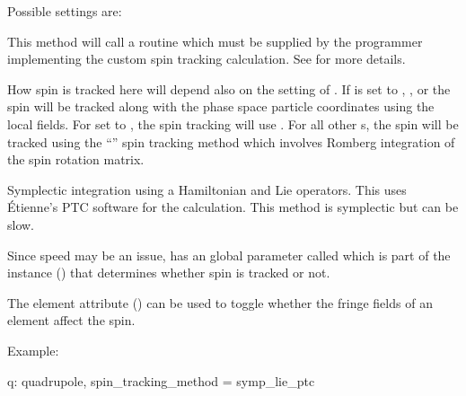 Possible  settings are:
\begin{description}

\item[\vn{Custom}] \Newline
This method will call a routine  which must be supplied by the
programmer implementing the custom spin tracking calculation. See  for
more details.

\item[\vn{Tracking}] \Newline
How spin is tracked here will depend also on the setting of . If
 is set to , , or  the spin will
be tracked along with the phase space particle coordinates using the local fields. For
 set to , the spin tracking will use .  For all other
s, the spin will be tracked using the ``'' spin tracking
method which involves Romberg integration of the spin rotation matrix.

\item[\vn{Symp_Lie_PTC}] \Newline
Symplectic integration using a Hamiltonian and Lie operators.  This uses \'Etienne's PTC
software for the calculation.  This method is symplectic but can be slow.

\end{description}

Since speed may be an issue, \bmad has an global parameter called
 which is part of the  instance
() that determines whether spin is tracked or not.

The  element attribute () can be used to toggle
whether the fringe fields of an element affect the spin.

Example:
\begin{example}
  q: quadrupole, spin_tracking_method = symp_lie_ptc
\end{example}


